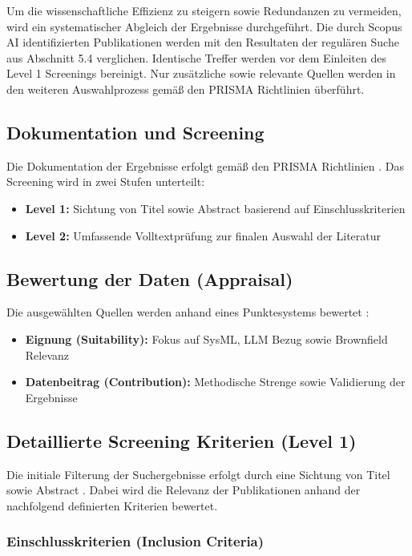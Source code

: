 Um die wissenschaftliche Effizienz zu steigern sowie Redundanzen zu vermeiden, wird ein systematischer Abgleich der Ergebnisse durchgeführt. Die durch Scopus AI identifizierten Publikationen werden mit den Resultaten der regulären Suche aus Abschnitt 5.4 verglichen. Identische Treffer werden vor dem Einleiten des Level 1 Screenings bereinigt. Nur zusätzliche sowie relevante Quellen werden in den weiteren Auswahlprozess gemäß den PRISMA Richtlinien \cite{Page.2021} überführt.

\subsection{Dokumentation und Screening}
Die Dokumentation der Ergebnisse erfolgt gemäß den PRISMA Richtlinien \cite{Page.2021}. Das Screening wird in zwei Stufen unterteilt:
\begin{itemize}
    \item \textbf{Level 1:} Sichtung von Titel sowie Abstract basierend auf Einschlusskriterien \cite{Higgins.2019b}
    \item \textbf{Level 2:} Umfassende Volltextprüfung zur finalen Auswahl der Literatur \cite{Higgins.2019b}
\end{itemize}
\subsection{Bewertung der Daten (Appraisal)}

Die ausgewählten Quellen werden anhand eines Punktesystems bewertet \cite{Balshem.2011,Guyatt.2008}:
\begin{itemize}
    \item \textbf{Eignung (Suitability):} Fokus auf SysML, LLM Bezug sowie Brownfield Relevanz
    \item \textbf{Datenbeitrag (Contribution):} Methodische Strenge sowie Validierung der Ergebnisse
\end{itemize}

\subsection{Detaillierte Screening Kriterien (Level 1)}

Die initiale Filterung der Suchergebnisse erfolgt durch eine Sichtung von Titel sowie Abstract \cite{Higgins.2019b}. Dabei wird die Relevanz der Publikationen anhand der nachfolgend definierten Kriterien bewertet\cite{Balshem.2011}.

\subsubsection{Einschlusskriterien (Inclusion Criteria)}

